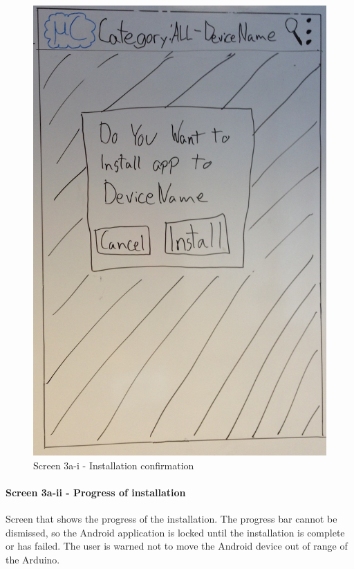\begin{figure}[H]
\centering
\includegraphics[scale=0.2]{images/Design_guide/Screen3a-i.png}
\caption{Screen 3a-i - Installation confirmation}
\end{figure}


\paragraph{Screen 3a-ii - Progress of installation}
Screen that shows the progress of the installation. The progress bar cannot be dismissed, so the Android application is locked until the installation is complete or has failed.
The user is warned not to move the Android device out of range of the Arduino.

